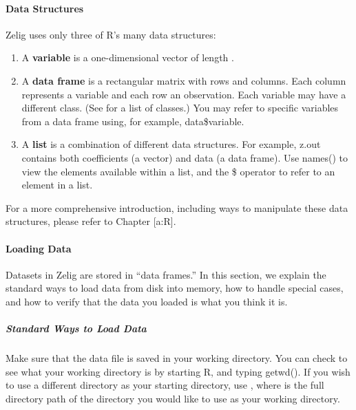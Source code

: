 \documentclass[letterpaper,10pt,english]{sphinxmanual}
\begin{document}
\paragraph{Data Structures}
\label{docs/user_guide:data-structures}
Zelig uses only three of R’s many data structures:
\begin{enumerate}
\item {} 
A \textbf{variable} is a one-dimensional vector of length .

\item {} 
A \textbf{data frame} is a rectangular matrix with  rows and
 columns. Each column represents a variable and each row an
observation. Each variable may have a different class. (See for a
list of classes.) You may refer to specific variables from a data
frame using, for example, data\$variable.

\item {} 
A \textbf{list} is a combination of different data structures. For
example, z.out contains both coefficients (a vector) and data (a data
frame). Use names() to view the elements available within a list, and
the \$ operator to refer to an element in a list.

\end{enumerate}

For a more comprehensive introduction, including ways to manipulate
these data structures, please refer to Chapter {[}a:R{]}.


\paragraph{Loading Data}
\label{docs/user_guide:loading-data}
Datasets in Zelig are stored in “data frames.” In this section, we
explain the standard ways to load data from disk into memory, how to
handle special cases, and how to verify that the data you loaded is what
you think it is.


\subparagraph{Standard Ways to Load Data}
\label{docs/user_guide:standard-ways-to-load-data}
Make sure that the data file is saved in your working directory. You can
check to see what your working directory is by starting R, and typing
getwd(). If you wish to use a different directory as your starting
directory, use , where  is the full
directory path of the directory you would like to use as your working
directory.
\end{document}
